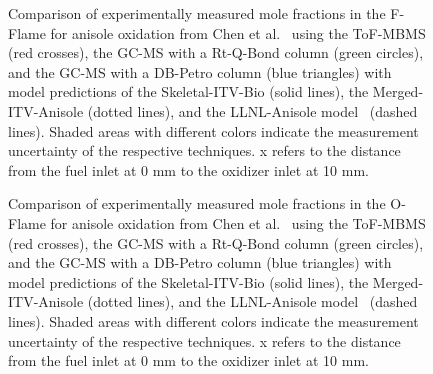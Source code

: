 \begin{refsection}
\begin{figure}[h]
  \hfill
  \hfill
  \caption{Comparison of experimentally measured mole fractions in the F-Flame for anisole oxidation from Chen et al.~\cite{Chen2022} using the ToF-MBMS (red crosses), the GC-MS with a Rt-Q-Bond column (green circles), and the GC-MS with a DB-Petro column (blue triangles) with model predictions of the Skeletal-ITV-Bio (solid lines), the Merged-ITV-Anisole (dotted lines), and the LLNL-Anisole model~\cite{Wagnon2018} (dashed lines). Shaded areas with different colors indicate the measurement uncertainty of the respective techniques. x refers to the distance from the fuel inlet at 0 mm to the oxidizer inlet at 10 mm.}
  \label{fig:B1bAnisoleOxidationBioMechanism}
\end{figure}
\begin{figure}[h]
  \centering
  \hfill
  \hfill
  \hfill
  \hfill
  \hfill
  \caption{Comparison of experimentally measured mole fractions in the O-Flame for anisole oxidation from Chen et al.~\cite{Chen2022} using the ToF-MBMS (red crosses), the GC-MS with a Rt-Q-Bond column (green circles), and the GC-MS with a DB-Petro column (blue triangles) with model predictions of the Skeletal-ITV-Bio (solid lines), the Merged-ITV-Anisole (dotted lines), and the LLNL-Anisole model~\cite{Wagnon2018} (dashed lines). Shaded areas with different colors indicate the measurement uncertainty of the respective techniques. x refers to the distance from the fuel inlet at 0 mm to the oxidizer inlet at 10 mm.}
  \label{fig:B1bAnisoleOxidationBioMechanismOXY}
\end{figure}




\end{refsection}
